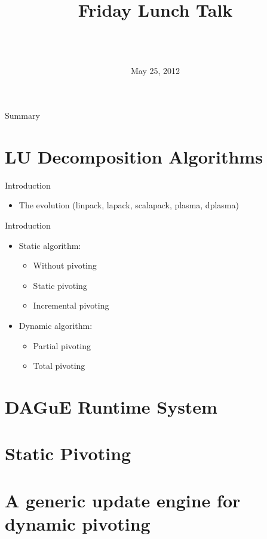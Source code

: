 \documentclass{beamer}
\title[LU Decompositions over DAGuE]{
        {\bfseries \projet\\} 
        {\bfseries \huge \sujet}
        {\small Friday Lunch Talk}
}
\date{May 25, 2012}
\author[Zenati]{
  {\normalsize \bfseries \sffamily} {\large \gA}\\
  \vspace{1cm}
  {\normalsize \bfseries \sffamily} {\large \gB}\\
}
\begin{document}
\begin{frame}
\maketitle
\end{frame}

\begin{frame}{Summary}
\tableofcontents
\end{frame}


\section[LU Algorithms]{LU Decomposition Algorithms}
\begin{frame}{Introduction}
\begin{itemize}
\item The evolution (linpack, lapack, scalapack, plasma, dplasma)
\end{itemize}
\end{frame}

\begin{frame}{Introduction}
\begin{itemize}
\item Static algorithm:
\begin{itemize}
\item Without pivoting
\item Static pivoting
\item Incremental pivoting
\end{itemize}
\item Dynamic algorithm:
\begin{itemize}
\item Partial pivoting
\item Total pivoting
\end{itemize}
\end{itemize}
\end{frame}

\section[DAGuE]{DAGuE Runtime System}


\section{Static Pivoting}



\section[Generic Update]{A generic update engine for dynamic pivoting}

\end{document}
